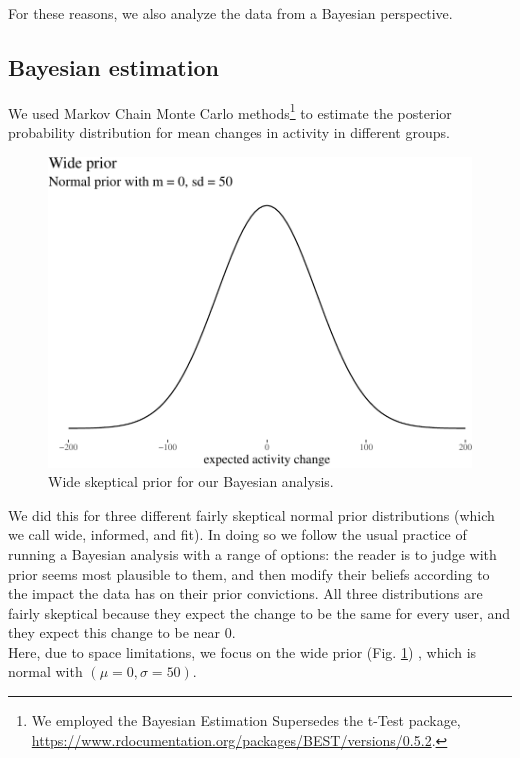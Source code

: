 \documentclass[10pt,dvipsnames]{scrartcl}
\begin{document}
For these reasons, we also analyze the data from a Bayesian perspective.

\subsection{Bayesian estimation}

We used Markov Chain Monte Carlo methods\footnote{We employed the
  \textsf{Bayesian Estimation Supersedes the t-Test} package,
  \url{https://www.rdocumentation.org/packages/BEST/versions/0.5.2}.} to
estimate the posterior probability distribution for mean changes in
activity in different groups.

\begin{figure}[H]

\begin{center}\includegraphics[width=1\linewidth]{quittingShortAbridgedRevisions2_files/figure-latex/unnamed-chunk-20-1} \end{center}
\caption{Wide  skeptical prior for our Bayesian analysis.}
\label{fig:priors}
\end{figure}

We did this for three different fairly skeptical normal prior
distributions (which we call \textsf{wide, informed}, and \textsf{fit}).
In doing so we follow the usual practice of running a Bayesian analysis
with a range of options: the reader is to judge with prior seems most
plausible to them, and then modify their beliefs according to the impact
the data has on their prior convictions. All three distributions are
fairly skeptical because they expect the change to be the same for every
user, and they expect this change to be near 0.\\
Here, due to space limitations, we focus on the wide prior (Fig.
\ref{fig:priors}) , which is normal with \((\mu = 0, \sigma = 50)\).
\end{document}
